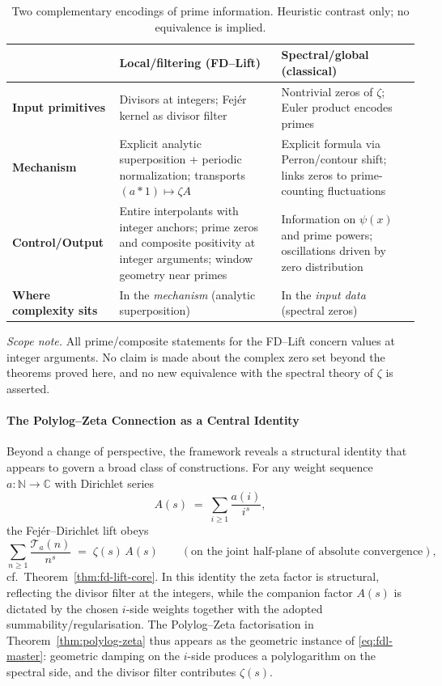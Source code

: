 \begin{table}[h]
\centering
\small
\begin{tabular}{@{}p{3.2cm}p{5.1cm}p{5.1cm}@{}}
\toprule
 & \textbf{Local/filtering (FD–Lift)} & \textbf{Spectral/global (classical)} \\
\midrule
\textbf{Input primitives} & Divisors at integers; Fej\'er kernel as divisor filter & Nontrivial zeros of $\zeta$; Euler product encodes primes \\
\textbf{Mechanism} & Explicit analytic superposition + periodic normalization; transports $(a*1)\mapsto \zeta A$ & Explicit formula via Perron/contour shift; links zeros to prime-counting fluctuations \\
\textbf{Control/Output} & Entire interpolants with integer anchors; prime zeros and composite positivity at integer arguments; window geometry near primes & Information on $\psi(x)$ and prime powers; oscillations driven by zero distribution \\
\textbf{Where complexity sits} & In the \emph{mechanism} (analytic superposition) & In the \emph{input data} (spectral zeros) \\
\bottomrule
\end{tabular}
\caption{Two complementary encodings of prime information. Heuristic contrast only; no equivalence is implied.}
\end{table}

\noindent\emph{Scope note.} All prime/composite statements for the FD–Lift concern values at integer arguments. No claim is made about the complex zero set beyond the theorems proved here, and no new equivalence with the spectral theory of $\zeta$ is asserted.
\\


\paragraph{The Polylog--Zeta Connection as a Central Identity}
Beyond a change of perspective, the framework reveals a structural identity that appears to govern a broad class of constructions. For any weight sequence $a:\mathbb N\to\mathbb C$ with Dirichlet series
\[
A(s)\;=\;\sum_{i\ge1}\frac{a(i)}{i^s},
\]
the Fej\'er--Dirichlet lift obeys
\begin{equation}\label{eq:fdl-master}
\sum_{n\ge1}\frac{\mathcal T_a(n)}{n^s}\;=\;\zeta(s)\,A(s)
\qquad(\text{on the joint half-plane of absolute convergence}),
\end{equation}
cf.\ Theorem~\ref{thm:fd-lift-core}. In this identity the zeta factor is structural, reflecting the divisor filter at the integers, while the companion factor $A(s)$ is dictated by the chosen $i$-side weights together with the adopted summability/regularisation. The Polylog--Zeta factorisation in Theorem~\ref{thm:polylog-zeta} thus appears as the geometric instance of \eqref{eq:fdl-master}: geometric damping on the $i$-side produces a polylogarithm on the spectral side, and the divisor filter contributes $\zeta(s)$.

